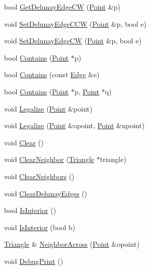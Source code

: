 \begin{DoxyCompactItemize}
\item 
bool \hyperlink{classp2t_1_1_triangle_af67e361a97a73f3df511c1bb6136bcd0}{Get\+Delunay\+Edge\+C\+W} (\hyperlink{structp2t_1_1_point}{Point} \&p)
\item 
void \hyperlink{classp2t_1_1_triangle_a9c03794465c4b11d44fb4a70e293d6b6}{Set\+Delunay\+Edge\+C\+C\+W} (\hyperlink{structp2t_1_1_point}{Point} \&p, bool e)
\item 
void \hyperlink{classp2t_1_1_triangle_a88d507283e97e0aa4331879c377debc7}{Set\+Delunay\+Edge\+C\+W} (\hyperlink{structp2t_1_1_point}{Point} \&p, bool e)
\item 
bool \hyperlink{classp2t_1_1_triangle_a8a64883e7f85899728fc01e14710eb29}{Contains} (\hyperlink{structp2t_1_1_point}{Point} $\ast$p)
\item 
bool \hyperlink{classp2t_1_1_triangle_a6f591a1d0eeea1199f522f5613bab5a3}{Contains} (const \hyperlink{structp2t_1_1_edge}{Edge} \&e)
\item 
bool \hyperlink{classp2t_1_1_triangle_aea43a2c5f9bab535b44bd9751498747f}{Contains} (\hyperlink{structp2t_1_1_point}{Point} $\ast$p, \hyperlink{structp2t_1_1_point}{Point} $\ast$q)
\item 
void \hyperlink{classp2t_1_1_triangle_a3dcb2db468072495f8f287a749e3cf2a}{Legalize} (\hyperlink{structp2t_1_1_point}{Point} \&point)
\item 
void \hyperlink{classp2t_1_1_triangle_ac1c464e079f8c373717640e70a10cba9}{Legalize} (\hyperlink{structp2t_1_1_point}{Point} \&opoint, \hyperlink{structp2t_1_1_point}{Point} \&npoint)
\item 
void \hyperlink{classp2t_1_1_triangle_ad09dfbf0bc0917e4f0b32ffa735f5e6f}{Clear} ()
\item 
void \hyperlink{classp2t_1_1_triangle_ad832db4869372180797a90afc83f59df}{Clear\+Neighbor} (\hyperlink{classp2t_1_1_triangle}{Triangle} $\ast$triangle)
\item 
void \hyperlink{classp2t_1_1_triangle_aae3687cbc5c1b3e4964b3072ab97c463}{Clear\+Neighbors} ()
\item 
void \hyperlink{classp2t_1_1_triangle_a435c14700eca2bee3c0e91ad8de051d8}{Clear\+Delunay\+Edges} ()
\item 
bool \hyperlink{classp2t_1_1_triangle_a9aaa9ee5f2184be6ffe64fe05b037233}{Is\+Interior} ()
\item 
void \hyperlink{classp2t_1_1_triangle_a6b39c78063b3af04d8cc156f4d4758c4}{Is\+Interior} (bool b)
\item 
\hyperlink{classp2t_1_1_triangle}{Triangle} \& \hyperlink{classp2t_1_1_triangle_a2623e8f9bcd5267728d77edb30c8dd2d}{Neighbor\+Across} (\hyperlink{structp2t_1_1_point}{Point} \&opoint)
\item 
void \hyperlink{classp2t_1_1_triangle_aeca5d9dadee27b9038618be9e450d030}{Debug\+Print} ()
\end{DoxyCompactItemize}
